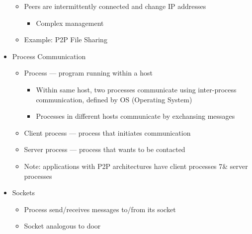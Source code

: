 \begin{itemize}
\begin{itemize}
      \item Peers are intermittently connected and change IP addresses 

        \begin{itemize}

          \item Complex management

        \end{itemize}

      \item Example: P2P File Sharing

    \end{itemize}

  \item Process Communication

    \begin{itemize}

      \item Process — program running within a host

        \begin{itemize}

          \item Within same host, two processes communicate using inter-process communication, defined by OS (Operating System)

          \item Processes in different hosts communicate by exchansing messages

        \end{itemize}

      \item Client process — process that initiates communication

      \item Server process — process that wants to be contacted

      \item Note: applications with P2P architectures have client processes 7& server processes

    \end{itemize}

  \item Sockets

    \begin{itemize}

      \item Process send/receives messages to/from its socket

      \item Socket analogous to door


\end{itemize}
\end{itemize}
